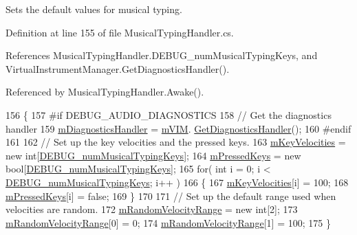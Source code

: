 Sets the default values for musical typing. 



Definition at line 155 of file Musical\+Typing\+Handler.\+cs.



References Musical\+Typing\+Handler.\+D\+E\+B\+U\+G\+\_\+num\+Musical\+Typing\+Keys, and Virtual\+Instrument\+Manager.\+Get\+Diagnostics\+Handler().



Referenced by Musical\+Typing\+Handler.\+Awake().


\begin{DoxyCode}
156     \{
157 \textcolor{preprocessor}{        #if DEBUG\_AUDIO\_DIAGNOSTICS}
158             \textcolor{comment}{// Get the diagnostics handler}
159             \hyperlink{group___mus_typ_priv_var_gaaeabcb1c6445b0ff93059036cc4ec1f4}{mDiagnosticsHandler} = \hyperlink{group___mus_typ_priv_var_ga63b2c5e1f9b1320a6b435a9018759444}{mVIM}.
      \hyperlink{group___v_i_m_pub_func_ga7e60bc3c5464d8f34f0d56def675bcc6}{GetDiagnosticsHandler}();
160 \textcolor{preprocessor}{        #endif}
161 
162         \textcolor{comment}{// Set up the key velocities and the pressed keys.}
163         \hyperlink{group___mus_typ_priv_var_ga4836c9fe1805279497f421a29879bf5a}{mKeyVelocities} = \textcolor{keyword}{new} \textcolor{keywordtype}{int}[\hyperlink{group___mus_typ_const_ga1a5182f5dda1cd3a5b400911a3f4cb69}{DEBUG\_numMusicalTypingKeys}];
164         \hyperlink{group___mus_typ_priv_var_gaede8bc4123f7bfe514816593fdfbec67}{mPressedKeys} = \textcolor{keyword}{new} \textcolor{keywordtype}{bool}[\hyperlink{group___mus_typ_const_ga1a5182f5dda1cd3a5b400911a3f4cb69}{DEBUG\_numMusicalTypingKeys}];
165         \textcolor{keywordflow}{for}( \textcolor{keywordtype}{int} i = 0; i < \hyperlink{group___mus_typ_const_ga1a5182f5dda1cd3a5b400911a3f4cb69}{DEBUG\_numMusicalTypingKeys}; i++ )
166         \{
167             \hyperlink{group___mus_typ_priv_var_ga4836c9fe1805279497f421a29879bf5a}{mKeyVelocities}[i] = 100;
168             \hyperlink{group___mus_typ_priv_var_gaede8bc4123f7bfe514816593fdfbec67}{mPressedKeys}[i] = \textcolor{keyword}{false};
169         \}
170 
171         \textcolor{comment}{// Set up the default range used when velocities are random.}
172         \hyperlink{group___mus_typ_priv_var_ga15df83911d88e77e46726ff5642d04e6}{mRandomVelocityRange} = \textcolor{keyword}{new} \textcolor{keywordtype}{int}[2];
173         \hyperlink{group___mus_typ_priv_var_ga15df83911d88e77e46726ff5642d04e6}{mRandomVelocityRange}[0] = 0;
174         \hyperlink{group___mus_typ_priv_var_ga15df83911d88e77e46726ff5642d04e6}{mRandomVelocityRange}[1] = 100;
175     \}
\end{DoxyCode}
